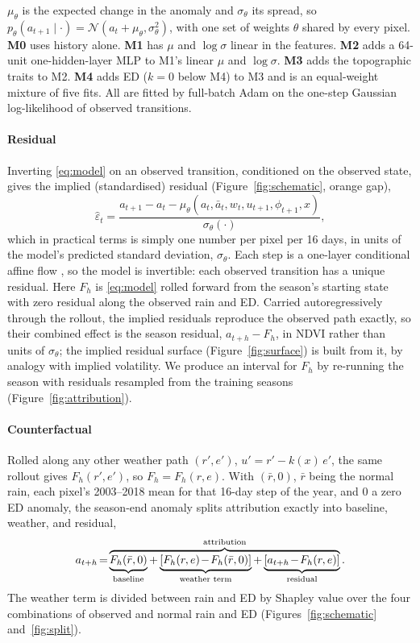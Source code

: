 \documentclass[letterpaper]{article} %
\begin{document}
$\mu_\theta$ is the expected change in the anomaly and $\sigma_\theta$ its spread, so $p_\theta(a_{t+1}\mid\cdot)=\mathcal N(a_t+\mu_\theta,\sigma_\theta^2)$, with one set of weights $\theta$ shared by every pixel. \textbf{M0} uses history alone. \textbf{M1} has $\mu$ and $\log\sigma$ linear in the features. \textbf{M2} adds a 64-unit one-hidden-layer MLP to M1's linear $\mu$ and $\log\sigma$. \textbf{M3} adds the topographic traits to M2. \textbf{M4} adds ED ($k=0$ below M4) to M3 and is an equal-weight mixture of five fits. All are fitted by full-batch Adam on the one-step Gaussian log-likelihood of observed transitions.

\paragraph{Residual} Inverting \eqref{eq:model} on an observed transition, conditioned on the observed state, gives the implied (standardised) residual (Figure~\ref{fig:schematic}, orange gap),
\begin{equation}
\hat\varepsilon_t = \frac{a_{t+1} - a_t - \mu_\theta(a_t,\bar a_t,w_t,u_{t+1},\phi_{t+1},x)}{\sigma_\theta(\cdot)},
\label{eq:implied}
\end{equation}
which in practical terms is simply one number per pixel per 16 days, in units of the model's predicted standard deviation, $\sigma_\theta$. Each step is a one-layer conditional affine flow \citep{papamakarios2021}, so the model is invertible: each observed transition has a unique residual. Here $F_h$ is \eqref{eq:model} rolled forward from the season's starting state with zero residual along the observed rain and ED. Carried autoregressively through the rollout, the implied residuals reproduce the observed path exactly, so their combined effect is the season residual, $a_{t+h}-F_h$, in NDVI rather than units of $\sigma_\theta$; the implied residual surface (Figure~\ref{fig:surface}) is built from it, by analogy with implied volatility. We produce an interval for $F_h$ by re-running the season with residuals resampled from the training seasons (Figure~\ref{fig:attribution}). 


\paragraph{Counterfactual} 

Rolled along any other weather path $(r',e')$, $u'=r'-k(x)\,e'$, the same rollout gives $F_h(r',e')$, so $F_h=F_h(r,e)$. With $(\bar r,0)$, $\bar r$ being the normal rain, each pixel's 2003--2018 mean for that 16-day step of the year, and $0$ a zero ED anomaly, the season-end anomaly splits attribution exactly into baseline, weather, and residual,
\begin{equation}
\medmuskip=1.5mu\thickmuskip=2.5mu
a_{t+h}=\overbrace{\underbrace{F_h(\bar r,0)}_{\text{baseline}}+\underbrace{[F_h(r,e)-F_h(\bar r,0)]}_{\text{weather term}}+\underbrace{[a_{t+h}-F_h(r,e)]}_{\text{residual}}}^{\text{attribution}}.
\label{eq:split}
\end{equation}
The weather term is divided between rain and ED by Shapley value over the four combinations of observed and normal rain and ED \citep{shapley1953} (Figures~\ref{fig:schematic} and~\ref{fig:split}). 
\end{document}
